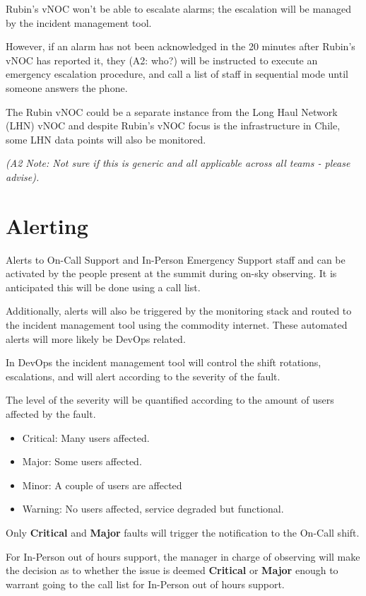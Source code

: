 Rubin's vNOC won't be able to escalate alarms; the escalation will be managed by the incident management tool.

However, if an alarm has not been acknowledged in the 20 minutes after Rubin's vNOC has reported it, they (A2: who?) will be instructed to execute an emergency escalation procedure, and call a list of staff in sequential mode until someone answers the phone.

The Rubin vNOC could be a separate instance from the Long Haul Network (LHN) vNOC and despite Rubin's vNOC focus is the infrastructure in Chile, some LHN data points will also be monitored.

\textit{
(A2 Note:  Not sure if this is generic and all applicable across all teams - please advise).}

\section{Alerting}

Alerts to On-Call Support and In-Person Emergency Support staff and can be activated by the people present at the summit during on-sky observing.  It is anticipated this will be done using a call list.

Additionally, alerts will also be triggered by the monitoring stack and routed to the incident management tool using the commodity internet.  These automated alerts will more likely be DevOps related.

In DevOps the incident management tool will control the shift rotations, escalations, and will alert according to the severity of the fault.

The level of the severity will be quantified according to the amount of users affected by the fault.

\begin{itemize}
    \item Critical: Many users affected.
    \item Major: Some users affected.
    \item Minor: A couple of users are affected
    \item Warning: No users affected, service degraded but functional.
\end{itemize}

Only \textbf{Critical} and \textbf{Major} faults will trigger the notification to the On-Call shift.

For In-Person out of hours support, the manager in charge of observing will make the decision as to whether the issue is deemed \textbf{Critical} or \textbf{Major} enough to warrant going to the call list for In-Person out of hours support.


